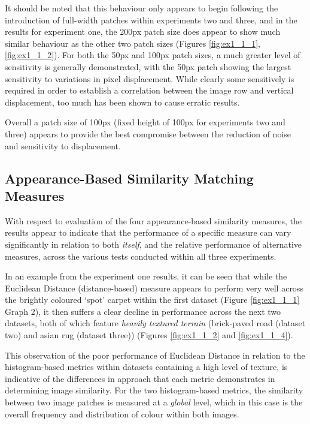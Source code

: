 It should be noted that this behaviour only appears to begin following the introduction of full-width patches within experiments two and three, and in the results for experiment one, the 200px patch size does appear to show much similar behaviour as the other two patch sizes (Figures \ref{fig:ex1_1_1}, \ref{fig:ex1_1_2}). For both the 50px and 100px patch sizes, a much greater level of sensitivity is generally demonstrated, with the 50px patch showing the largest sensitivity to variations in pixel displacement. While clearly some sensitively is required in order to establish a correlation between the image row and vertical displacement, too much has been shown to cause erratic results.

Overall a patch size of 100px (fixed height of 100px for experiments two and three) appears to provide the best compromise between the reduction of noise and sensitivity to displacement.

\subsection{Appearance-Based Similarity Matching Measures}

With respect to evaluation of the four appearance-based similarity measures, the results appear to indicate that the performance of a specific measure can vary significantly in relation to both \textit{itself}, and the relative performance of alternative measures, across the various tests conducted within all three experiments. 

In an example from the experiment one results, it can be seen that while the Euclidean Distance (distance-based) measure appears to perform very well across the brightly coloured `spot' carpet within the first dataset (Figure \ref{fig:ex1_1_1} Graph 2), it then suffers a clear decline in performance across the next two datasets, both of which feature \textit{heavily textured terrain} (brick-paved road (dataset two) and asian rug (dataset three)) (Figures \ref{fig:ex1_1_2} and \ref{fig:ex1_1_4}). 

This observation of the poor performance of Euclidean Distance in relation to the histogram-based metrics within datasets containing a high level of texture, is indicative of the differences in approach that each metric demonstrates in determining image similarity. For the two histogram-based metrics, the similarity between two image patches is measured at a \textit{global} level, which in this case is the overall frequency and distribution of colour within both images. 

